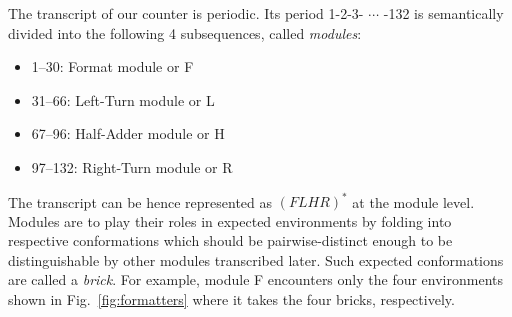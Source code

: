 \documentclass[runningheads]{llncs}
\begin{document}
The transcript of our counter is periodic.
Its period 1-2-3- $\cdots$ -132 is semantically divided into the following 4 subsequences, called \textit{modules}:
\begin{itemize}
\item 1--30: Format module or F
\item 31--66: Left-Turn module or L
\item 67--96: Half-Adder module or H
\item 97--132: Right-Turn module  or R
\end{itemize}
The transcript can be hence represented as $(FLHR)^*$ at the module level. Modules are to play their roles in expected environments by folding into respective conformations which should be pairwise-distinct enough to be distinguishable by other modules transcribed later.
Such expected conformations are called a \textit{brick}.
For example, module F encounters only the four environments shown in Fig.~\ref{fig:formatters} where it takes the four bricks, respectively.
\end{document}
